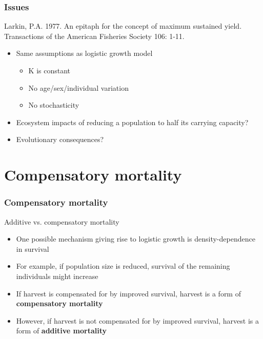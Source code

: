 \documentclass[color=usenames,dvipsnames]{beamer}\usepackage[]{graphicx}\usepackage[]{xcolor}
\begin{document}
\begin{frame}
  \frametitle{Issues}
  {\flushleft Larkin, P.A. 1977. An epitaph for the concept of maximum
    sustained yield. Transactions of the American Fisheries Society 106: 1-11. \par}
  \pause
  \begin{itemize}%
    \item Same assumptions as logistic growth model
      \begin{itemize}
        \item<3-> K is constant
        \item<3-> No age/sex/individual variation
        \item<3-> No stochasticity
      \end{itemize}
    \item<4-> Ecosystem impacts of reducing a population
      to half its carrying capacity?
    \item<5-> Evolutionary consequences?
  \end{itemize}
\end{frame}





\section{Compensatory mortality}






\begin{frame}
  \frametitle{Compensatory mortality}
  \large
  {Additive vs. compensatory mortality}
  \begin{itemize}[<+->]
    \item One possible mechanism giving rise to logistic growth is
      density-dependence in survival
    \item For example, if population size is reduced, survival of the
      remaining individuals might increase
    \item If harvest is compensated for by improved survival, harvest
      is a form of \alert{\bf compensatory mortality}
    \item However, if harvest is not compensated for by improved
      survival, harvest is a form of \alert{\bf additive mortality}
  \end{itemize}
  \vfill
\end{frame}
\end{document}
